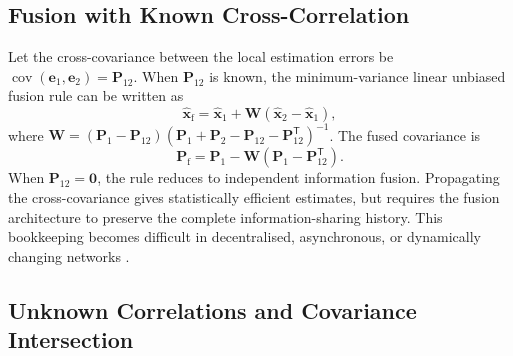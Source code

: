 \subsection{Fusion with Known Cross-Correlation}

Let the cross-covariance between the local estimation errors be $\operatorname{cov}(\mathbf{e}_{1},\mathbf{e}_{2})=\mathbf{P}_{12}$. When $\mathbf{P}_{12}$ is known, the minimum-variance linear unbiased
fusion rule can be written as
\begin{equation}
\widehat{\mathbf{x}}_{\mathrm{f}}=\widehat{\mathbf{x}}_{1}+\mathbf{W}\left(\widehat{\mathbf{x}}_{2}-\widehat{\mathbf{x}}_{1}\right),
\label{eq:correlated-track-fusion-state}
\end{equation}
where $\mathbf{W}=\left(\mathbf{P}_{1}-\mathbf{P}_{12}\right)\left(\mathbf{P}_{1}+\mathbf{P}_{2}-\mathbf{P}_{12}-\mathbf{P}_{12}^{\mathsf T}\right)^{-1}$. The fused covariance is
\begin{equation}
\mathbf{P}_{\mathrm{f}}=\mathbf{P}_{1}-\mathbf{W}\left(\mathbf{P}_{1}-\mathbf{P}_{12}^{\mathsf T}\right).
\label{eq:correlated-track-fusion-cov}
\end{equation}
When $\mathbf{P}_{12}=\mathbf{0}$, the rule reduces to independent
information fusion. Propagating the cross-covariance gives statistically
efficient estimates, but requires the fusion architecture to preserve the
complete information-sharing history. This bookkeeping becomes difficult
in decentralised, asynchronous, or dynamically changing networks
\cite{barshalom1995multitarget,saha1998track,
barshalom2011tracking}.

\subsection{Unknown Correlations and Covariance Intersection}

